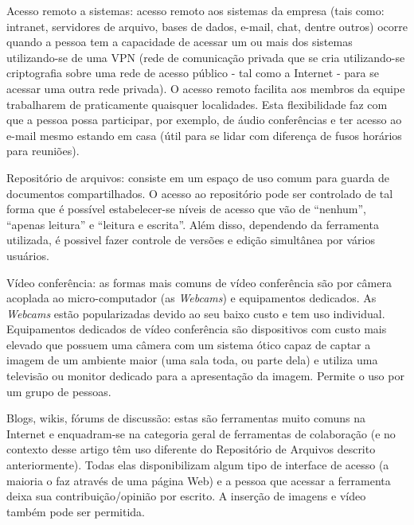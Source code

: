 \documentclass[12pt]{article} %
\begin{document}
\begin{description}
\item{Acesso remoto a sistemas:} acesso remoto aos sistemas da empresa 
    (tais como: intranet, servidores de arquivo, bases de dados, e-mail, chat, dentre outros) ocorre quando
    a pessoa tem a capacidade de acessar um ou mais dos sistemas utilizando-se de uma VPN (rede de comunicação 
	privada que se cria utilizando-se criptografia sobre uma rede de acesso público - tal como a Internet - 
		para se acessar uma outra rede privada).
    O acesso remoto
    facilita aos membros da equipe trabalharem de praticamente quaisquer localidades. Esta flexibilidade
    faz com que a pessoa possa participar, por exemplo, de áudio conferências e ter acesso ao e-mail mesmo estando 
    em casa (útil para se lidar com diferença de fusos horários para reuniões).

\item{Repositório de arquivos:} consiste em um espaço de uso comum para guarda de documentos compartilhados.
	O acesso ao repositório pode ser controlado de tal forma que é possível estabelecer-se níveis de acesso
	que vão de ``nenhum'', ``apenas leitura'' e ``leitura e escrita''.
	Além disso, dependendo da ferramenta utilizada, é possivel fazer
	controle de versões e edição simultânea por vários usuários.


\item{Vídeo conferência:} as formas mais comuns de vídeo conferência são por câmera acoplada ao micro-computador (as
	\textit{Webcams}) e equipamentos dedicados. As \textit{Webcams} estão popularizadas devido ao seu baixo custo e tem
	uso individual. Equipamentos dedicados de vídeo conferência são dispositivos com custo mais elevado que possuem uma 
	câmera com um sistema ótico capaz de captar a imagem de um ambiente maior (uma sala toda, ou parte dela) e 
	utiliza uma televisão ou monitor dedicado para a apresentação da imagem. Permite o uso por um grupo de pessoas.

\item{Blogs, wikis, fórums de discussão:} estas são ferramentas muito comuns na Internet e enquadram-se na categoria 
    geral de ferramentas de colaboração (e no contexto desse artigo têm uso diferente do Repositório de Arquivos
    descrito anteriormente). Todas elas disponibilizam algum tipo de interface de acesso (a maioria o faz através de uma página Web)
	e a pessoa que acessar a ferramenta deixa sua contribuição/opinião por escrito. A inserção de imagens e vídeo também
	pode ser permitida. 

\end{description}
\end{document}
